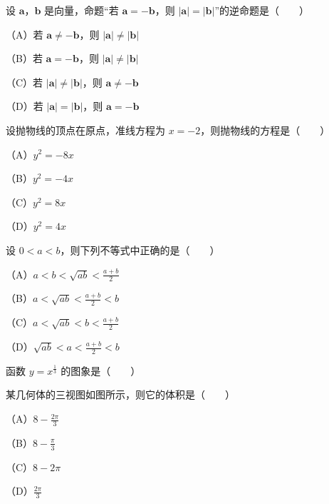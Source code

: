 

\begin{question}
设 $\boldsymbol a$，$\boldsymbol b$ 是向量，命题“若 $\boldsymbol a=-\boldsymbol b$，则 $|\boldsymbol a|=|\boldsymbol b|$”的逆命题是\mbox{（　　）}

（A）若 $\boldsymbol a\ne-\boldsymbol b$，则 $|\boldsymbol a|\ne|\boldsymbol b|$

（B）若 $\boldsymbol a=-\boldsymbol b$，则 $|\boldsymbol a|\ne|\boldsymbol b|$

（C）若 $|\boldsymbol a|\ne|\boldsymbol b|$，则 $\boldsymbol a\ne-\boldsymbol b$

（D）若 $|\boldsymbol a|=|\boldsymbol b|$，则 $\boldsymbol a=-\boldsymbol b$

\end{question}
\begin{question}
设抛物线的顶点在原点，准线方程为 $x=-2$，则抛物线的方程是\mbox{（　　）}

（A）$y^2=-8x$

（B）$y^2=-4x$

（C）$y^2=8x$

（D）$y^2=4x$

\end{question}
\begin{question}
设 $0<a<b$，则下列不等式中正确的是\mbox{（　　）}

（A）$a<b<\sqrt{ab}<\frac{a+b}2$

（B）$a<\sqrt{ab}<\frac{a+b}2<b$

（C）$a<\sqrt{ab}<b<\frac{a+b}2$

（D）$\sqrt{ab}<a<\frac{a+b}2<b$

\Needspace{0.4\textheight}
\end{question}
\begin{question}
函数 $y=x^{\frac13}$ 的图象是\mbox{（　　）}
\nopagebreak[4]
\begin{center}\end{center}
\nopagebreak[4]
\Needspace{0.4\textheight}
\end{question}
\begin{question}
某几何体的三视图如图所示，则它的体积是\mbox{（　　）}

（A）$8-\frac{2\pi}3$

（B）$8-\frac{\pi}3$

（C）$8-2\pi$

（D）$\frac{2\pi}3$
\nopagebreak[4]
\begin{center}\end{center}
\nopagebreak[4]
\end{question}
